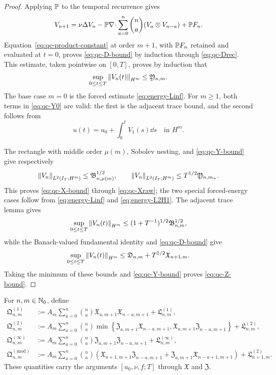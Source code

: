 \begin{proof}
Applying \(\mathbb P\) to the temporal recurrence gives
\begin{equation}
 V_{n+1}=\nu\Delta V_n
 -\mathbb P\nabla\!\cdot\sum_{a=0}^{n}\binom na
 (V_a\otimes V_{n-a})+\mathbb P F_n.
 \label{eq:qc-projected-temporal-recurrence}
\end{equation}
Equation~\eqref{eq:qc-product-constant} at order \(m+1\), with
\(\mathbb P F_n\) retained and evaluated at
\(t=0\), proves \eqref{eq:qc-D-bound} by induction through
\eqref{eq:qc-Drec}.  This estimate, taken pointwise on \([0,T]\),
proves by induction that
\begin{equation}
 \sup_{0\le t\le T}\left\lVert V_n(t)\right\rVert_{H^m}
 \le\mathfrak Y_{n,m}.
 \label{eq:qc-Y-bound}
\end{equation}
The base case \(m=0\) is the forced estimate \eqref{eq:energy-Linf}.  For \(m\ge1\), both
terms in \eqref{eq:qc-Y0} are valid: the first is the adjacent trace bound,
and the second follows from
\[
 u(t)=u_0+\int_0^tV_1(s)\dd s
 \quad\text{in }H^m.
\]

The rectangle with middle order \(\mu(m)\), Sobolev nesting, and
\eqref{eq:qc-Y-bound} give respectively
\[
 \left\lVert V_n\right\rVert_{L^2(I_T;H^m)}
 \le\mathfrak B_{n,\mu(m)}^{1/2},
 \qquad
 \left\lVert V_n\right\rVert_{L^2(I_T;H^m)}
 \le T^{1/2}\mathfrak Y_{n,m_+}.
\]
This proves \eqref{eq:qc-X-bound} through \eqref{eq:qc-Xraw}; the two
special forced-energy cases follow from \eqref{eq:energy-Linf} and
\eqref{eq:energy-L2H1}.  The adjacent trace lemma gives
\[
 \sup_{0\le t\le T}\left\lVert V_n(t)\right\rVert_{H^m}
 \le(1+T^{-1})^{1/2}\mathfrak B_{n,m}^{1/2},
\]
while the Banach-valued fundamental identity and
\eqref{eq:qc-D-bound} give
\[
 \sup_{0\le t\le T}\left\lVert V_n(t)\right\rVert_{H^m}
 \le\mathfrak D_{n,m}+T^{1/2}\mathfrak X_{n+1,m}.
\]
Taking the minimum of these bounds and \eqref{eq:qc-Y-bound} proves
\eqref{eq:qc-Z-bound}.
\end{proof}

\begin{definition}
\label{def:qc-closed-pressure-majorants}
For \(n,m\in\mathbb N_0\), define
\begin{align}
 \mathfrak Q^{(1)}_{n,m}
 &:={}
 A_m\sum_{a=0}^{n}\binom na
 \mathfrak X_{a,m+1}\mathfrak X_{n-a,m+1}
 +\mathfrak L^{(1)}_{n,m},
 \label{eq:qc-Q1}\\
 \mathfrak Q^{(2)}_{n,m}
 &:={}
 A_m\sum_{a=0}^{n}\binom na
 \min\left\{
 \mathfrak Z_{a,m+1}\mathfrak X_{n-a,m+1},
 \mathfrak X_{a,m+1}\mathfrak Z_{n-a,m+1}
 \right\}
 +\mathfrak L^{(2)}_{n,m},
 \label{eq:qc-Q2}\\
 \mathfrak Q^{(\infty)}_{n,m}
 &:={}
 A_m\sum_{a=0}^{n}\binom na
 \mathfrak Z_{a,m+1}\mathfrak Z_{n-a,m+1}
 +\mathfrak L^{(\infty)}_{n,m},
 \label{eq:qc-Qinfty}\\
 \mathfrak Q^{(\mathrm{mod})}_{n,m}
 &:={}
 A_m\sum_{a=0}^{n}\binom na
 \left(
 \mathfrak X_{a+1,m+1}\mathfrak Z_{n-a,m+1}
 +\mathfrak Z_{a,m+1}\mathfrak X_{n-a+1,m+1}
 \right)
 +\mathfrak L^{(2)}_{n+1,m}.
 \label{eq:qc-Qmod}
\end{align}
These quantities carry the arguments \([u_0,\nu,f;T]\) through
\(\mathfrak X\) and \(\mathfrak Z\).
\end{definition}

